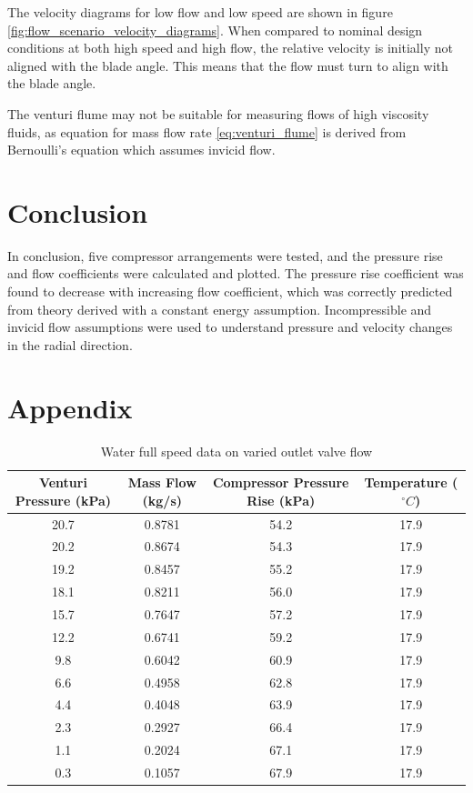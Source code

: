\documentclass{article}
\begin{document}
The velocity diagrams for low flow and low speed are shown in figure \ref{fig:flow_scenario_velocity_diagrams}.
When compared to nominal design conditions at both high speed and high flow, the relative velocity is initially not aligned with the blade angle.
This means that the flow must turn to align with the blade angle.

The venturi flume may not be suitable for measuring flows of high viscosity fluids, as equation for mass flow rate \ref{eq:venturi_flume} 
is derived from Bernoulli's equation which assumes invicid flow.

\section{Conclusion}

In conclusion, five compressor arrangements were tested, and the pressure rise and flow coefficients were calculated and plotted.
The pressure rise coefficient was found to decrease with increasing flow coefficient, 
which was correctly predicted from theory derived with a constant energy assumption.
Incompressible and invicid flow assumptions were used to understand pressure and velocity changes in the radial direction.


\section{Appendix}

\begin{table}[H]
    \centering
    \begin{tabular}{cccc}
        \hline
        Venturi Pressure (kPa) & Mass Flow (kg/s) & Compressor Pressure Rise (kPa) & Temperature ($^\circ C$)\\
        \hline
        20.7 & 0.8781 & 54.2 & 17.9 \\
        20.2 & 0.8674 & 54.3 & 17.9 \\
        19.2 & 0.8457 & 55.2 & 17.9 \\
        18.1 & 0.8211 & 56.0 & 17.9 \\
        15.7 & 0.7647 & 57.2 & 17.9 \\
        12.2 & 0.6741 & 59.2 & 17.9 \\
        9.8 & 0.6042 & 60.9 & 17.9 \\
        6.6 & 0.4958 & 62.8 & 17.9 \\
        4.4 & 0.4048 & 63.9 & 17.9 \\
        2.3 & 0.2927 & 66.4 & 17.9 \\
        1.1 & 0.2024 & 67.1 & 17.9 \\
        0.3 & 0.1057 & 67.9 & 17.9 \\
        \hline
    \end{tabular}
    \caption{Water full speed data on varied outlet valve flow}
    \label{tab:water_full_speed_outlet_data}
\end{table}
\end{document}
